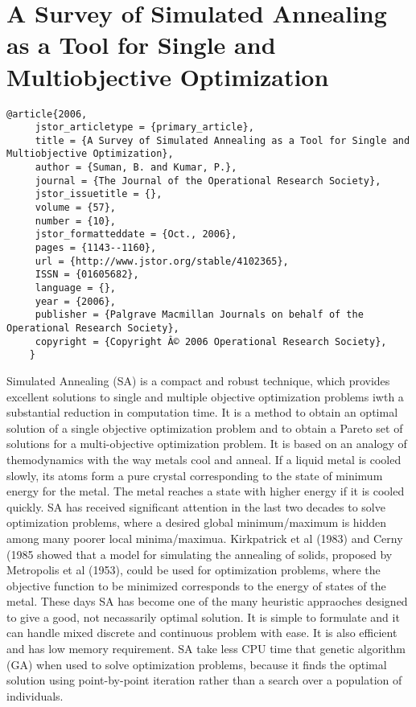 \documentclass[pdftex,11pt]{article}
\begin{document}
\section*{A Survey of Simulated Annealing as a Tool for Single and Multiobjective Optimization}
\begin{verbatim}
@article{2006,
     jstor_articletype = {primary_article},
     title = {A Survey of Simulated Annealing as a Tool for Single and Multiobjective Optimization},
     author = {Suman, B. and Kumar, P.},
     journal = {The Journal of the Operational Research Society},
     jstor_issuetitle = {},
     volume = {57},
     number = {10},
     jstor_formatteddate = {Oct., 2006},
     pages = {1143--1160},
     url = {http://www.jstor.org/stable/4102365},
     ISSN = {01605682},
     language = {},
     year = {2006},
     publisher = {Palgrave Macmillan Journals on behalf of the Operational Research Society},    
     copyright = {Copyright Â© 2006 Operational Research Society},
    }
\end{verbatim}
Simulated Annealing (SA) is a compact and robust technique, which provides excellent solutions to single and multiple objective optimization problems iwth a substantial reduction in computation time. It is a method to obtain an optimal solution of a single objective optimization problem and to obtain a Pareto set of solutions for a multi-objective optimization problem. It is based on an analogy of themodynamics with the way metals cool and anneal. If a liquid metal is cooled slowly, its atoms form a pure crystal corresponding to the state of minimum energy for the metal. The metal reaches a state with higher energy if it is cooled quickly. SA has received significant attention in the last two decades to solve optimization problems, where a desired global minimum/maximum is hidden among many poorer local minima/maximua. Kirkpatrick et al (1983) and Cerny (1985 showed that a model for simulating the annealing of solids, proposed by Metropolis et al (1953), could be used for optimization problems, where the objective function to be minimized corresponds to the energy of states of the metal. These days SA has become one of the many heuristic appraoches designed to give a good, not necassarily optimal solution. It is simple to formulate and it can handle mixed discrete and continuous problem with ease. It is also efficient and has low memory requirement. SA take less CPU time that genetic algorithm (GA) when used to solve optimization problems, because it finds the optimal solution using point-by-point iteration rather than a search over a population of individuals.
\end{document}
